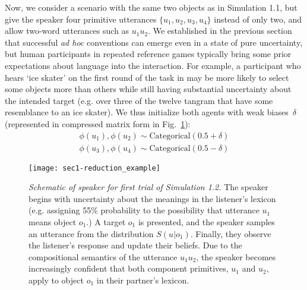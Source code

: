 Now, we consider a scenario with the same two objects as in Simulation 1.1, but give the speaker four primitive utterances $\{u_1, u_2, u_3, u_4\}$ instead of only two, and allow two-word utterances such as $u_1u_2$.
We established in the previous section that successful \emph{ad hoc} conventions can emerge even in a state of pure uncertainty, but human participants in repeated reference games typically bring some prior expectations about language into the interaction.
For example, a participant who hears `ice skater' on the first round of the task in  may be more likely to select some objects more than others while still having substantial uncertainty about the intended target (e.g. over three of the twelve tangram that have some resemblance to an ice skater).
We thus initialize both agents with weak biases $\delta$ (represented in compressed matrix form in Fig.~\ref{fig:sec1efficiency}):
\begin{align}
\phi(u_1), \phi(u_2) \sim \textrm{Categorical}(0.5 + \delta) \nonumber\\
\phi(u_3), \phi(u_4) \sim \textrm{Categorical}(0.5 - \delta) \nonumber
\end{align}

\begin{figure}[t]
\centering
    \texttt{[image: sec1-reduction\_example]}
  \caption{\emph{Schematic of speaker for first trial of Simulation 1.2.} The speaker begins with uncertainty about the meanings in the listener's lexicon (e.g. assigning 55\% probability to the possibility that utterance $u_1$ means object $o_1$.) A target $o_1$ is presented, and the speaker samples an utterance from the distribution $S(u|o_1)$. Finally, they observe the listener's response and update their beliefs. Due to the compositional semantics of the utterance $u_1u_2$, the speaker becomes increasingly confident that both component primitives, $u_1$ and $u_2$, apply to object $o_1$ in their partner's lexicon.}
  \label{fig:sec1efficiency}
\end{figure}


